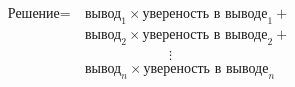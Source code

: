\documentclass[preview]{standalone}
\begin{document}
\begin{align*}
\text{Решение}=\  &\text{вывод}_1 \times \text{увереность в выводе}_1 +\\ &\text{вывод}_2 \times \text{увереность в выводе}_2 +\\ &\qquad\qquad\qquad\vdots\\ &\text{вывод}_n \times \text{увереность в выводе}_n\\
\end{align*}
\end{document}
